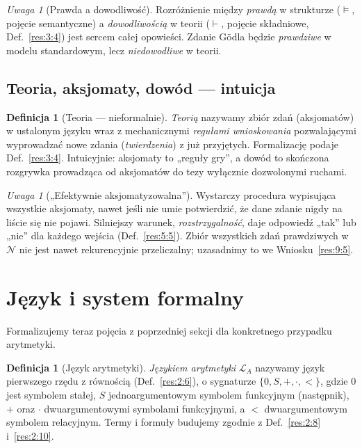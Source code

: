 \documentclass[11pt,a4paper]{article}
\numberwithin{equation}{section}
\theoremstyle{plain}
\theoremstyle{definition}
\newtheorem{definicja}[twierdzenie]{Definicja}
\theoremstyle{remark}
\newtheorem{uwaga}[twierdzenie]{Uwaga}
\begin{document}
\begin{uwaga}[Prawda a dowodliwość]\label{res:2:16}
Rozróżnienie między \emph{prawdą} w strukturze ($\models$, pojęcie semantyczne) a \emph{dowodliwością} w teorii ($\vdash$, pojęcie składniowe, Def.~\ref{res:3:4}) jest sercem całej opowieści. Zdanie Gödla będzie \emph{prawdziwe} w modelu standardowym, lecz \emph{niedowodliwe} w teorii.
\end{uwaga}

\subsection*{Teoria, aksjomaty, dowód --- intuicja}\label{sec:teoria-dowod-intuicja}
\begin{definicja}[Teoria --- nieformalnie]\label{res:2:17}
\emph{Teorią} nazywamy zbiór zdań (aksjomatów) w ustalonym języku wraz z mechanicznymi \emph{regułami wnioskowania} pozwalającymi wyprowadzać nowe zdania (\emph{twierdzenia}) z już przyjętych. Formalizację podaje Def.~\ref{res:3:4}. Intuicyjnie: aksjomaty to „reguły gry”, a dowód to skończona rozgrywka prowadząca od aksjomatów do tezy wyłącznie dozwolonymi ruchami.
\end{definicja}

\begin{uwaga}[„Efektywnie aksjomatyzowalna”]\label{res:2:18}
Wystarczy procedura wypisująca wszystkie aksjomaty, nawet jeśli nie umie potwierdzić, że dane zdanie nigdy na liście się nie pojawi. Silniejszy warunek, \emph{rozstrzygalność}, daje odpowiedź „tak” lub „nie” dla każdego wejścia (Def.~\ref{res:5:5}). Zbiór wszystkich zdań prawdziwych w $\mathcal N$ nie jest nawet rekurencyjnie przeliczalny; uzasadnimy to we Wniosku~\ref{res:9:5}.
\end{uwaga}

\section{Język i system formalny}\label{sec:system-formalny}
Formalizujemy teraz pojęcia z poprzedniej sekcji dla konkretnego przypadku arytmetyki.

\begin{definicja}[Język arytmetyki]\label{res:3:1}
\emph{Językiem arytmetyki} $\mathcal L_A$ nazywamy język pierwszego rzędu z równością (Def.~\ref{res:2:6}), o sygnaturze $\{0,S,+,\cdot,<\}$, gdzie $0$ jest symbolem stałej, $S$ jednoargumentowym symbolem funkcyjnym (następnik), $+$ oraz $\cdot$ dwuargumentowymi symbolami funkcyjnymi, a $<$ dwuargumentowym symbolem relacyjnym. Termy i formuły budujemy zgodnie z Def.~\ref{res:2:8} i~\ref{res:2:10}.
\end{definicja}
\end{document}
